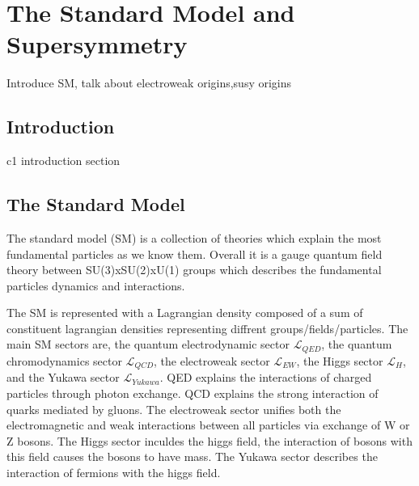 



\setcounter{secnumdepth}{3}
\setcounter{tocdepth}{3}
\setlength{\parskip}{\smallskipamount}
\setlength{\parindent}{0pt}


\makeatletter


\providecommand{\tabularnewline}{\\}


\makeatother

%

\chapter{The Standard Model and Supersymmetry}

\begin{chapterabstract}
Introduce SM, talk about electroweak origins,susy origins
\end{chapterabstract}

\section{Introduction}

c1 introduction section

\section{The Standard Model}

The standard model (SM) is a collection of theories which explain the most fundamental particles as we know them. Overall it is a gauge quantum field theory between SU(3)xSU(2)xU(1) groups which describes the fundamental particles  dynamics and interactions.


The SM is represented with a Lagrangian density composed of a sum of constituent lagrangian densities representing diffrent groups/fields/particles. The main SM sectors are, the quantum electrodynamic sector $\mathcal{L}_{QED}$, the quantum chromodynamics sector $\mathcal{L}_{QCD}$, the electroweak sector $\mathcal{L}_{EW}$, the Higgs sector $\mathcal{L}_{H}$, and the Yukawa sector $\mathcal{L}_{Yukawa}$.  QED explains the interactions of charged particles through photon exchange. QCD explains the strong interaction of quarks mediated by gluons. The electroweak sector unifies both the electromagnetic and weak interactions between all particles via exchange of W or Z bosons. 
The Higgs sector inculdes the higgs field, the interaction of bosons with this field causes the bosons to have mass. The Yukawa sector describes the interaction of fermions with the higgs field.

